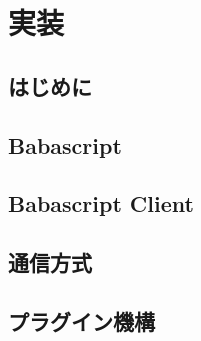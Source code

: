 \chapter{実装}
\label{chap:implementation}

\section{はじめに}

\section{Babascript}

\section{Babascript Client}

\section{通信方式}

\section{プラグイン機構}
